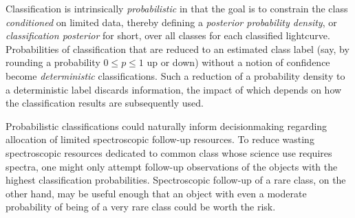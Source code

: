Classification is intrinsically \textit{probabilistic} in that the goal is to constrain the class \textit{conditioned} on limited data, thereby defining a \textit{posterior probability density}, or \textit{classification posterior} for short, over all classes for each classified lightcurve.
Probabilities of classification that are reduced to an estimated class label (say, by rounding a probability $0 \leq p \leq 1$ up or down) without a notion of confidence become \textit{deterministic} classifications.
Such a reduction of a probability density to a deterministic label discards information, the impact of which depends on how the classification results are subsequently used.

Probabilistic classifications could naturally inform decisionmaking regarding allocation of limited spectroscopic follow-up resources.
To reduce wasting spectroscopic resources dedicated to common class whose science use requires spectra, one might only attempt follow-up observations of the objects with the highest classification probabilities.
Spectroscopic follow-up of a rare class, on the other hand, may be useful enough that an object with even a moderate probability of being of a very rare class could be worth the risk.

